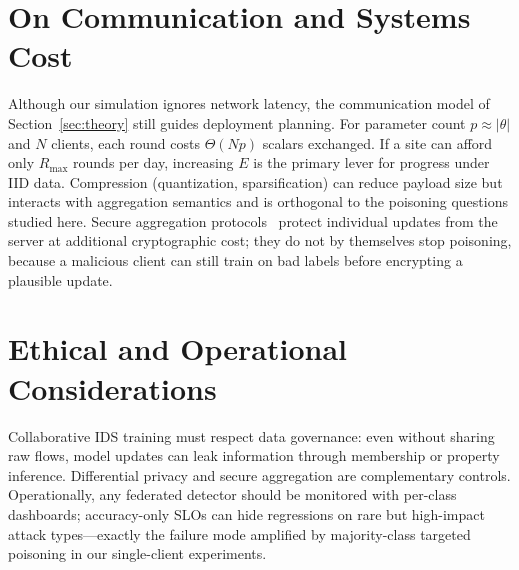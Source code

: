 \documentclass[journal]{IEEEtran}
\begin{document}
\section{On Communication and Systems Cost}
\label{app:comm}
Although our simulation ignores network latency, the communication model of Section~\ref{sec:theory} still guides deployment planning. For parameter count $p\approx |\theta|$ and $N$ clients, each round costs $\Theta(Np)$ scalars exchanged. If a site can afford only $R_{\max}$ rounds per day, increasing $E$ is the primary lever for progress under IID data. Compression (quantization, sparsification) can reduce payload size but interacts with aggregation semantics and is orthogonal to the poisoning questions studied here. Secure aggregation protocols~\cite{bonawitz2019towards} protect individual updates from the server at additional cryptographic cost; they do not by themselves stop poisoning, because a malicious client can still train on bad labels before encrypting a plausible update.

\section{Ethical and Operational Considerations}
\label{app:ethics}
Collaborative IDS training must respect data governance: even without sharing raw flows, model updates can leak information through membership or property inference. Differential privacy and secure aggregation are complementary controls. Operationally, any federated detector should be monitored with per-class dashboards; accuracy-only SLOs can hide regressions on rare but high-impact attack types---exactly the failure mode amplified by majority-class targeted poisoning in our single-client experiments.
\end{document}
